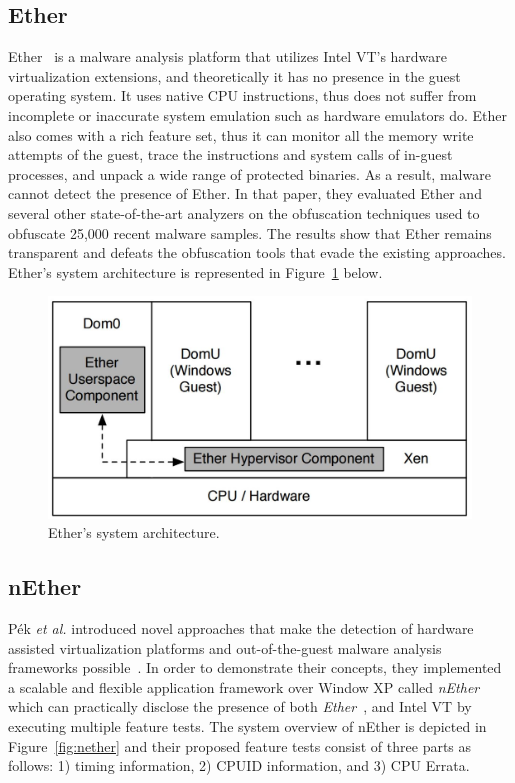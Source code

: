 \subsection{Ether}
Ether~\cite{ether} is a malware analysis platform that utilizes 
Intel VT's hardware virtualization extensions, and theoretically it has no presence 
in the guest operating system. It uses native CPU instructions, thus does not suffer from 
incomplete or inaccurate system emulation such as hardware emulators do. 
Ether also comes with a rich feature set, thus it can monitor 
all the memory write attempts of the guest, trace the instructions and 
system calls of in-guest processes, and unpack a wide range of protected binaries. 
As a result, malware cannot detect the presence of Ether. In that paper, 
they evaluated Ether and several other state-of-the-art analyzers on the obfuscation techniques 
used to obfuscate 25,000 recent malware samples. The results show that Ether remains transparent 
and defeats the obfuscation tools that evade the existing approaches. 
Ether's system architecture is represented in Figure~\ref{fig:ether} below.

\begin{figure}[!h]
	\centering
	\includegraphics[width=\linewidth]{figure/ether.png}
	\caption{Ether's system architecture.}
	\label{fig:ether}
\end{figure}

\subsection{nEther}
P{\'e}k \textit{et al.} introduced novel approaches that make the detection of hardware assisted virtualization platforms and out-of-the-guest malware analysis frameworks possible~\cite{nether}. In order to demonstrate their concepts, they implemented a scalable and flexible application framework over Window XP called \textit{nEther} which can practically disclose the presence of both \textit{Ether}~\cite{ether}, and Intel VT by executing multiple feature tests. The system overview of nEther is depicted in Figure~\ref{fig:nether} and their proposed feature tests consist of three parts as follows: 1) timing information, 2) CPUID information, and 3) CPU Errata. 

